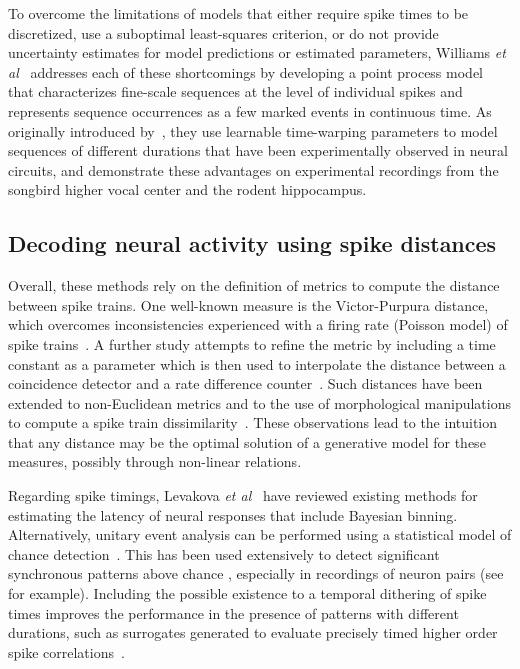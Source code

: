 \documentclass[runningheads]{llncs}
\begin{document}
To overcome the limitations of models that either require spike times to be discretized, use a suboptimal least-squares criterion, or do not provide uncertainty estimates for model predictions or estimated parameters, Williams {\it et al}~\cite{williams_point_2020} addresses each of these shortcomings by developing a point process model that characterizes fine-scale sequences at the level of individual spikes and represents sequence occurrences as a few marked events in continuous time. As originally introduced by~\cite{kass_statistical_2005}, they use learnable time-warping parameters to model sequences of different durations that have been experimentally observed in neural circuits, and demonstrate these advantages on experimental recordings from the songbird higher vocal center and the rodent hippocampus. 
%
\subsection{Decoding neural activity using spike distances}
%
Overall, these methods rely on the definition of metrics to compute the distance between spike trains. One well-known measure is the Victor-Purpura distance, which overcomes inconsistencies experienced with a firing rate (Poisson model) of spike trains~\cite{victor_nature_1996}. A further study attempts to refine the metric by including a time constant as a parameter which is then used to interpolate the distance between a coincidence detector and a rate difference counter~\cite{van_rossum_novel_2001}. Such distances have been extended to non-Euclidean metrics and to the use of morphological manipulations to compute a spike train dissimilarity~\cite{kreuz_measuring_2007}. These observations lead to the intuition that any distance may be the optimal solution of a generative model for these measures, possibly through non-linear relations.%

Regarding spike timings, Levakova {\it et al}~\cite{levakova_review_2015} have reviewed existing methods for estimating the latency of neural responses that include Bayesian binning. Alternatively, unitary event analysis can be performed using a statistical model of chance detection~\cite{grun_unitary_2002-1}. This has been used extensively to detect significant synchronous patterns above chance%
, especially in recordings of neuron pairs (see~\cite{riehle_spike_1997} for example). %
Including the possible existence to a temporal dithering of spike times improves the performance in the presence of patterns with different durations, such as surrogates generated to evaluate precisely timed higher order spike correlations~\cite{stella_comparing_2022}. %
%
\end{document}
